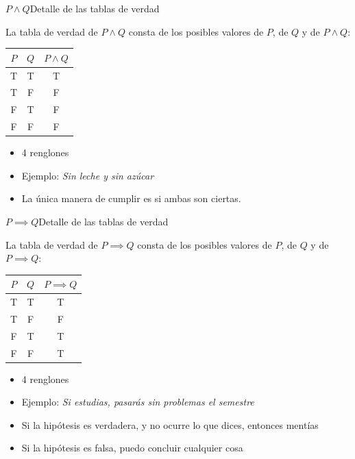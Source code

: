 \documentclass[spanish, c]{beamer}
\begin{document}
\begin{frame}{$P \wedge Q$}{Detalle de las tablas de verdad}

    La tabla de verdad de $P \wedge Q$ consta de los posibles valores de $P$, de $Q$ y de $P \wedge Q$:
    
    \begin{table}[H]
        \begin{tabular}{@{}ccc@{}}
        \toprule
        $P$ & $Q$ & $P \wedge Q$ \\ \midrule
        T   & T    & T          \\
        T   & F    & F          \\
        F   & T    & F          \\
        F   & F    & F          \\ \bottomrule
        \end{tabular}
    \end{table}

    \begin{itemize}
        \item 4 renglones
        \item Ejemplo: \textit{Sin leche y sin azúcar}
        \item La única manera de cumplir es si ambas son ciertas.
    \end{itemize}

\end{frame}

\begin{frame}{$P \implies Q$}{Detalle de las tablas de verdad}

    La tabla de verdad de $P \implies Q$ consta de los posibles valores de $P$, de $Q$ y de $P \implies Q$:
    
    \begin{table}[H]
        \begin{tabular}{@{}ccc@{}}
        \toprule
        $P$ & $Q$ & $P \implies Q$ \\ \midrule
        T   & T    & T          \\
        T   & F    & F          \\
        F   & T    & T          \\
        F   & F    & T          \\ \bottomrule
        \end{tabular}
    \end{table}

    \begin{itemize}
        \item 4 renglones
        \item Ejemplo: \textit{Si estudias, pasarás sin problemas el semestre}
        \item Si la hipótesis es verdadera, y no ocurre lo que dices, entonces mentías
        \item Si la hipótesis es falsa, puedo concluir cualquier cosa
    \end{itemize}

\end{frame}
\end{document}
